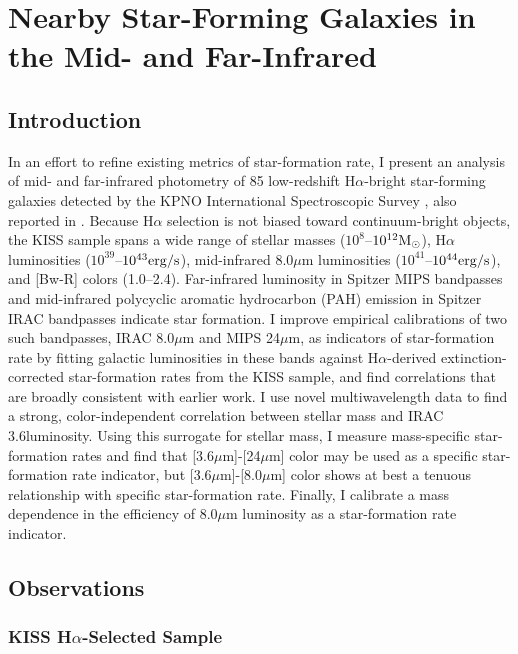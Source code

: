 \newcommand{\fit}[2]{coeff}

\chapter{Nearby Star-Forming Galaxies in the Mid- and Far-Infrared}
\label{ch:kiss}

\section{Introduction}

In an effort to refine existing metrics of star-formation rate, I present an analysis of mid- and far-infrared photometry of 85 low-redshift H$\alpha$-bright star-forming galaxies detected by the KPNO International Spectroscopic Survey  \citep[KISS;][]{KISSI}, also reported in \cite{Young1}. Because H$\alpha$ selection is not biased toward continuum-bright objects, the KISS sample spans a wide range of stellar masses ($10^8$--$10^{12}\rm{M}_\odot$), H$\alpha$ luminosities ($10^{39}$--$10^{43}\rm{erg/s}$), mid-infrared 8.0$\mu$m luminosities ($10^{41}$--$10^{44}\rm{erg/s}$), and [Bw-R] colors (1.0--2.4). Far-infrared luminosity in Spitzer MIPS bandpasses and mid-infrared polycyclic aromatic hydrocarbon (PAH) emission in Spitzer IRAC bandpasses indicate star formation. I improve empirical calibrations of two such bandpasses, IRAC 8.0$\mu$m and MIPS 24$\mu$m, as indicators of star-formation rate by fitting galactic luminosities in these bands against H$\alpha$-derived extinction-corrected star-formation rates from the KISS sample, and find correlations that are broadly consistent with earlier work. I use novel multiwavelength data to find a strong, color-independent correlation between stellar mass and IRAC 3.6\micron luminosity. Using this surrogate for stellar mass, I measure mass-specific star-formation rates and find that [3.6$\mu$m]-[24$\mu$m] color may be used as a specific star-formation rate indicator, but [3.6$\mu$m]-[8.0$\mu$m] color shows at best a tenuous relationship with specific star-formation rate. Finally, I calibrate a mass dependence in the efficiency of 8.0$\mu$m luminosity as a star-formation rate indicator.

\section{Observations}
\label{sec:kissobs}

\subsection{KISS H$\alpha$-Selected Sample}

